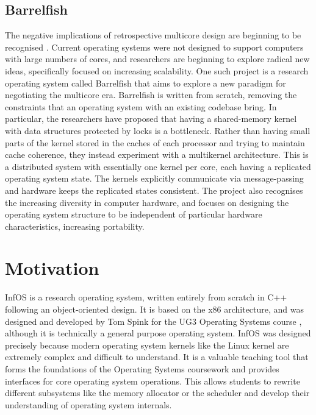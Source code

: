 \documentclass[bsc,frontabs,singlespacing,parskip,deptreport]{infthesis}
\begin{document}
\subsection{Barrelfish}
The negative implications of retrospective multicore design are beginning to be recognised \cite{barrelfish-article}. Current operating systems were not designed to support computers with large numbers of cores, and researchers are beginning to explore radical new ideas, specifically focused on increasing scalability. One such project is a research operating system called Barrelfish \cite{barrelfish-website} that aims to explore a new paradigm for negotiating the multicore era. Barrelfish is written from scratch, removing the constraints that an operating system with an existing codebase bring. In particular, the researchers have proposed that having a shared-memory kernel with data structures protected by locks is a bottleneck. Rather than having small parts of the kernel stored in the caches of each processor and trying to maintain cache coherence, they instead experiment with a multikernel architecture. This is a distributed system with essentially one kernel per core, each having a replicated operating system state. The kernels explicitly communicate via message-passing and hardware keeps the replicated states consistent. The project also recognises the increasing diversity in computer hardware, and focuses on designing the operating system structure to be independent of particular hardware characteristics, increasing portability. 

\section{Motivation} \label{motivation}
InfOS \cite{infos} is a research operating system, written entirely from scratch in C++ following an object-oriented design. It is based on the x86 architecture, and was designed and developed by Tom Spink for the UG3 Operating Systems course \cite{ug3os}, although it is technically a general purpose operating system. InfOS was designed precisely because modern operating system kernels like the Linux kernel are extremely complex and difficult to understand. It is a valuable teaching tool that forms the foundations of the Operating Systems coursework and provides interfaces for core operating system operations. This allows students to rewrite different subsystems like the memory allocator or the scheduler and develop their understanding of operating system internals. 
\end{document}
